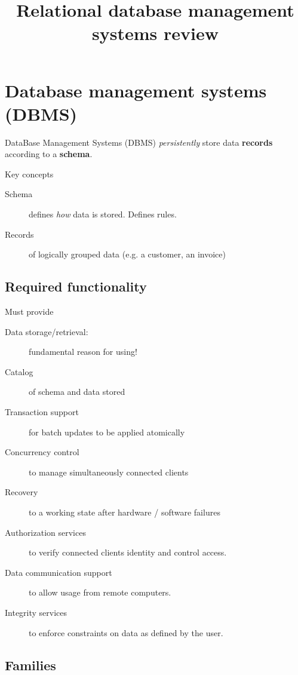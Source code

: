 \documentclass[slides]{pgnotes}
\title{Relational database management systems review}
\begin{document}
\maketitle

\tableofcontents

\section{Database management systems (DBMS)}\label{sec:dbms}

DataBase Management Systems (DBMS) \textit{persistently} store data \textbf{records} according to a \textbf{schema}.

\begin{bluebox}{Key concepts}
\begin{description}
\item[Schema] defines \textit{how} data is stored. Defines rules.
\item[Records] of logically grouped data (e.g. a customer, an invoice)
\end{description}
\end{bluebox}

\subsection{Required functionality}

\begin{greenbox}{Must provide}
\begin{description}
\item[Data storage/retrieval:] fundamental reason for using! 
\item[Catalog] of schema and data stored
\item[Transaction support] for batch updates to be applied atomically
\item[Concurrency control] to manage simultaneously connected clients
\item[Recovery] to a working state after hardware / software failures
\item[Authorization services] to verify connected clients identity and control access.
\item[Data communication support] to allow usage from remote computers.
\item[Integrity services] to enforce constraints on data as defined by the user.
\end{description}
\end{greenbox}

\subsection{Families}
\end{document}
